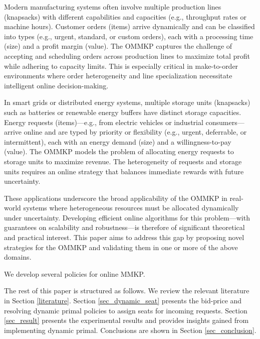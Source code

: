 Modern manufacturing systems often involve multiple production lines (knapsacks) with different capabilities and capacities (e.g., throughput rates or machine hours). Customer orders (items) arrive dynamically and can be classified into types (e.g., urgent, standard, or custom orders), each with a processing time (size) and a profit margin (value). The OMMKP captures the challenge of accepting and scheduling orders across production lines to maximize total profit while adhering to capacity limits. This is especially critical in make-to-order environments where order heterogeneity and line specialization necessitate intelligent online decision-making.


In smart grids or distributed energy systems, multiple storage units (knapsacks) such as batteries or renewable energy buffers have distinct storage capacities. Energy requests (items)—e.g., from electric vehicles or industrial consumers—arrive online and are typed by priority or flexibility (e.g., urgent, deferrable, or intermittent), each with an energy demand (size) and a willingness-to-pay (value). The OMMKP models the problem of allocating energy requests to storage units to maximize revenue. The heterogeneity of requests and storage units requires an online strategy that balances immediate rewards with future uncertainty.



These applications underscore the broad applicability of the OMMKP in real-world systems where heterogeneous resources must be allocated dynamically under uncertainty. Developing efficient online algorithms for this problem—with guarantees on scalability and robustness—is therefore of significant theoretical and practical interest. This paper aims to address this gap by proposing novel strategies for the OMMKP and validating them in one or more of the above domains.




We develop several policies for online MMKP. 

The rest of this paper is structured as follows. We review the relevant literature in Section \ref{literature}. Section \ref{sec_dynamic_seat} presents the bid-price and resolving dynamic primal policies to assign seats for incoming requests. Section \ref{sec_result} presents the experimental results and provides insights gained from implementing dynamic primal. Conclusions are shown in Section \ref{sec_conclusion}.